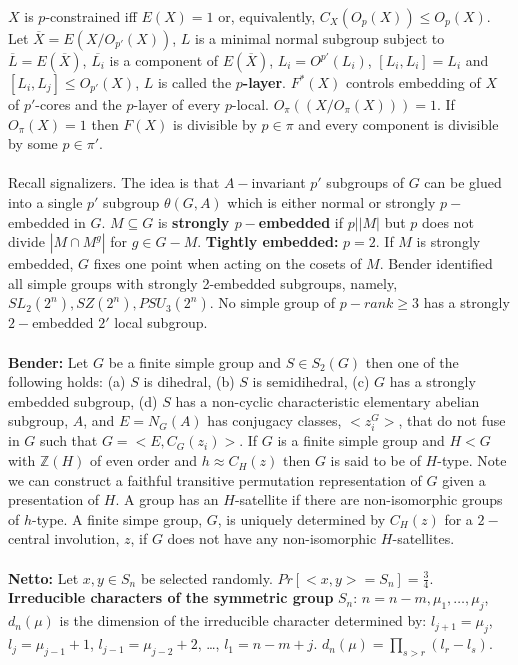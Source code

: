 $X$ is $p$-constrained iff $E(X)=1$ or, equivalently, $C_X(O_p(X)) \le O_p(X)$.
Let ${\overline X}= E(X/O_{p'}(X))$, 
$L$ is a minimal normal subgroup subject to ${\overline L}= E({\overline X})$,
${\overline {L_i}}$ is a component of $E({\overline X})$, $L_i= O^{p'}(L_i)$,
$[L_i, L_i]= L_i$ and $[L_i, L_j] \le O_{p'}(X)$, 
$L$ is called the {\bf $p$-layer}.  $F^*(X)$ controls embedding of $X$ of
$p'$-cores and the $p$-layer of every $p$-local.  $O_{\pi}((X/O_{\pi}(X)))=1$.
If $O_{\pi}(X)=1$ then $F(X)$ is divisible by $p \in \pi$ and every component is
divisible by some $p \in \pi'$.\\
\\
Recall signalizers.  The idea is that
$A-$invariant $p'$ subgroups of $G$ can be glued into a single $p'$
subgroup $\theta(G,A)$ which is either normal or strongly $p-$embedded in $G$.
$M \subseteq G$ is {\bf strongly $p-$embedded} if $p | |M|$ but $p$ does not divide
$|M \cap M^g |$ for $g \in G-M$.  {\bf Tightly embedded:} $p=2$. If $M$ is strongly
embedded, $G$ fixes one point when acting on the cosets of $M$.
Bender identified all simple groups with strongly 2-embedded subgroups, namely,
$SL_2(2^n), SZ(2^n), PSU_3(2^n)$.  No simple group of
$p-rank \ge 3$ has a strongly $2-$embedded $2'$ local subgroup.\\
\\
{\bf Bender:} Let $G$ be a finite simple group and $S \in S_2(G)$ then one of the following holds:
(a) $S$ is dihedral, (b) $S$ is semidihedral, (c) $G$ has a strongly embedded subgroup,
(d) $S$ has a non-cyclic characteristic elementary abelian subgroup, $A$, and
$E=N_G(A)$ has conjugacy classes, $<z_i^G>$, that do not fuse in $G$ such that
$G= <E, C_G(z_i )>$.  If $G$ is a finite simple group and
$H<G$ with ${\mathbb Z}(H)$ of even order and $h \approx C_H(z)$ then $G$ is said
to be of $H$-type.  Note we can construct a faithful transitive permutation representation
of $G$ given a presentation of $H$.  A group has an $H$-satellite if there are non-isomorphic
groups of $h$-type.
A finite simpe group, $G$, is uniquely determined by $C_H(z)$ for a $2-$central
involution, $z$, if $G$ does not have any non-isomorphic $H$-satellites.
\\
\\
{\bf Netto:}  Let $x,y \in S_n$ be selected randomly.  $Pr[<x,y>=S_n]= {\frac 3 4}$.  
{\bf Irreducible
characters of the symmetric group} $S_n$: $n= n-m, \mu_1, \ldots , \mu_j$, $d_{n}(\mu)$ is the dimension of the
irreducible character determined by: $l_{j+1}= \mu_j$, $l_j= \mu_{j-1}+1$, $l_{j-1}= \mu_{j-2}+2$,
\ldots, $l_1= n-m+j$.  $d_n(\mu)= \prod_{s>r} (l_r-l_s)$.

